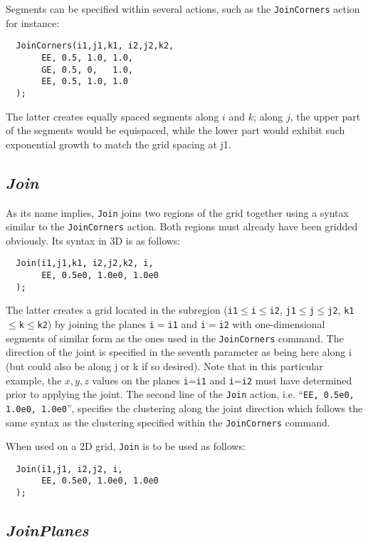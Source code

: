 \documentclass{warpdoc}
\begin{document}
Segments can be specified within several actions, such as the  \verb|JoinCorners| action for instance:
%
\begin{verbatim}
  JoinCorners(i1,j1,k1, i2,j2,k2,
       EE, 0.5, 1.0, 1.0,
       GE, 0.5, 0,   1.0,
       EE, 0.5, 1.0, 1.0
  );
\end{verbatim}
%
The latter creates equally spaced segments along $i$ and $k$;
along $j$, the upper part of the segments would be equispaced,
while the lower part would exhibit such exponential growth to
match the grid spacing at j1.


\subsection{\emph{Join}}

As its name implies, \verb|Join| joins two regions
of the grid together using a syntax similar to the
\verb|JoinCorners| action. Both regions must already
have been gridded obviously. Its syntax in 3D is as follows:
%
\begin{verbatim}
  Join(i1,j1,k1, i2,j2,k2, i,
       EE, 0.5e0, 1.0e0, 1.0e0
  );
\end{verbatim}
%
The latter creates a grid located in the subregion
(\verb|i1|$\leq$\verb|i|$\leq$\verb|i2|,
  \verb|j1|$\leq$\verb|j|$\leq$\verb|j2|,
  \verb|k1|$\leq$\verb|k|$\leq$\verb|k2|)
by joining the planes \verb|i|$=$\verb|i1| and \verb|i|$=$\verb|i2| with
one-dimensional segments of similar form as the ones used in the
\verb|JoinCorners| command. The direction of the joint is
specified in the seventh parameter as being here along i
(but could also be along j or k if so desired). Note that
in this particular example, the $x,y,z$ values on the planes
\verb|i|=\verb|i1| and \verb|i|=\verb|i2| must have determined prior
to applying the joint.  The second line of the \verb|Join|
action, i.e. ``\verb|EE, 0.5e0, 1.0e0, 1.0e0|'', specifies the clustering
along the joint direction which follows the same syntax as
the clustering specified within the \verb|JoinCorners| command.

When used on a 2D grid, \verb|Join| is to be used as follows:
%
\begin{verbatim}
  Join(i1,j1, i2,j2, i,
       EE, 0.5e0, 1.0e0, 1.0e0
  );
\end{verbatim}



\subsection{\emph{JoinPlanes}}
\end{document}
